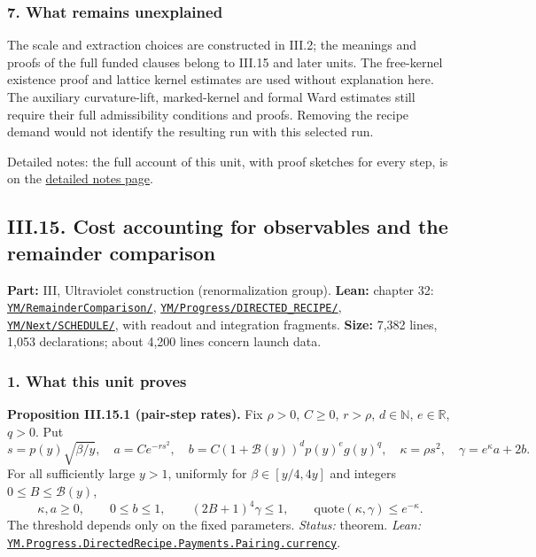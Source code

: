 \documentclass[
  letterpaper,
  11pt]{article}
\begin{document}
\subsubsection{7. What remains
unexplained}\label{what-remains-unexplained-16}

The scale and extraction choices are constructed in III.2; the meanings
and proofs of the full funded clauses belong to III.15 and later units.
The free-kernel existence proof and lattice kernel estimates are used
without explanation here. The auxiliary curvature-lift, marked-kernel
and formal Ward estimates still require their full admissibility
conditions and proofs. Removing the recipe demand would not identify the
resulting run with this selected run.

Detailed notes: the full account of this unit, with proof sketches for
every step, is on the
\href{https://github.com/scottnarmstrong/yang-mills-informalization/blob/main/outline/notes/III-14.md}{detailed
notes page}.

\subsection{III.15. Cost accounting for observables and the remainder
comparison}\label{iii.15.-cost-accounting-for-observables-and-the-remainder-comparison}

\textbf{Part:} III, Ultraviolet construction (renormalization group).
\textbf{Lean:} chapter 32:
\href{https://github.com/yang-mills-group/OpenAI-YM-20261028/tree/3456e5e75cf8d4cd558955a5c7638fba2d68f464/YM/RemainderComparison}{\texttt{YM/RemainderComparison/}},
\href{https://github.com/yang-mills-group/OpenAI-YM-20261028/tree/3456e5e75cf8d4cd558955a5c7638fba2d68f464/YM/Progress/DIRECTED_RECIPE}{\texttt{YM/Progress/DIRECTED\_RECIPE/}},
\href{https://github.com/yang-mills-group/OpenAI-YM-20261028/tree/3456e5e75cf8d4cd558955a5c7638fba2d68f464/YM/Next/SCHEDULE}{\texttt{YM/Next/SCHEDULE/}},
with readout and integration fragments. \textbf{Size:} 7,382 lines,
1,053 declarations; about 4,200 lines concern launch data.

\subsubsection{1. What this unit proves}\label{what-this-unit-proves-17}

\textbf{Proposition III.15.1 (pair-step rates).} Fix \(\rho>0\),
\(C\ge0\), \(r>\rho\), \(d\in\mathbb N\), \(e\in\mathbb R\), \(q>0\).
Put
\[s=p(y)\sqrt{\beta/y},\quad a=Ce^{-rs^2},\quad b=C(1+\mathcal B(y))^dp(y)^eg(y)^q,\quad \kappa=\rho s^2,\quad\gamma=e^\kappa a+2b.\]
For all sufficiently large \(y>1\), uniformly for \(\beta\in[y/4,4y]\)
and integers \(0\le B\le\mathcal B(y)\),
\[\kappa,a\ge0,\qquad0\le b\le1,\qquad(2B+1)^4\gamma\le1,\qquad\mathrm{quote}(\kappa,\gamma)\le e^{-\kappa}.\]
The threshold depends only on the fixed parameters. \emph{Status:}
theorem. \emph{Lean:}
\href{https://github.com/yang-mills-group/OpenAI-YM-20261028/blob/3456e5e75cf8d4cd558955a5c7638fba2d68f464/YM/Progress/DIRECTED_RECIPE/Economy.lean\#L76-L139}{\texttt{YM.Progress.DirectedRecipe.Payments.Pairing.currency}}.
\end{document}
